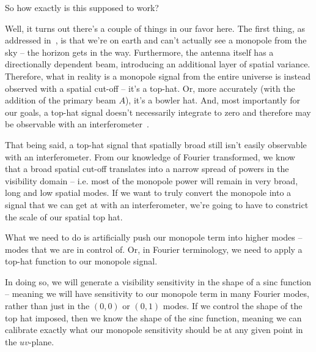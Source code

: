 So how exactly is this supposed to work?

Well, it turns out there's a couple of things in our favor here. The first 
thing, as addressed in~\citet{presley2015}, is that we're on earth and can't 
actually see a monopole from the sky -- the horizon gets in the way.  
Furthermore, the antenna itself has a directionally dependent beam, introducing 
an additional layer of spatial variance. Therefore, what in reality is a 
monopole signal from the entire universe is instead observed with a spatial 
cut-off -- it's a top-hat.  Or, more accurately (with the addition of the 
primary beam $A$), it's a bowler hat. And, most importantly for our goals, a 
top-hat signal doesn't necessarily integrate to zero and therefore may be 
observable with an interferometer~\citep{venumadhav2016}.

That being said, a top-hat signal that spatially broad still isn't easily 
observable with an interferometer. From our knowledge of Fourier transformed, 
we know that a broad spatial cut-off translates into a narrow spread of powers 
in the visibility domain -- i.e. most of the monopole power will remain in very 
broad, long and low spatial modes. If we want to truly convert the monopole 
into a signal that we can get at with an interferometer, we're going to have to 
constrict the scale of our spatial top hat.

What we need to do is artificially push our monopole term into higher modes -- 
modes that we are in control of. Or, in Fourier terminology, we need to apply a 
top-hat function to our monopole signal. 

In doing so, we will generate a visibility sensitivity in the shape of a sinc 
function -- meaning we will have sensitivity to our monopole term in many 
Fourier modes, rather than just in the $(0,0)$ or $(0,1)$ modes. If we control 
the shape of the top hat imposed, then we know the shape of the sinc function, 
meaning we can calibrate exactly what our monopole sensitivity should be at any 
given point in the $uv$-plane.

